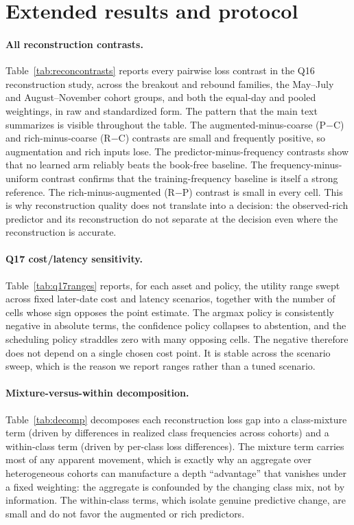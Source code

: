 \section{Extended results and protocol}
\label{app:extended}

\paragraph{All reconstruction contrasts.} Table~\ref{tab:reconcontrasts} reports every
pairwise loss contrast in the Q16 reconstruction study, across the breakout and rebound
families, the May--July and August--November cohort groups, and both the equal-day and pooled
weightings, in raw and standardized form. The pattern that the main text summarizes is
visible throughout the table. The augmented-minus-coarse (P$-$C) and rich-minus-coarse
(R$-$C) contrasts are small and frequently positive, so augmentation and rich inputs lose.
The predictor-minus-frequency contrasts show that no learned arm reliably beats the
book-free baseline. The frequency-minus-uniform contrast confirms that the
training-frequency baseline is itself a strong reference. The rich-minus-augmented (R$-$P)
contrast is small in every cell. This is why reconstruction quality does not translate into
a decision: the observed-rich predictor and its reconstruction do not separate at the
decision even where the reconstruction is accurate.



\paragraph{Q17 cost/latency sensitivity.} Table~\ref{tab:q17ranges} reports, for each asset
and policy, the utility range swept across fixed later-date cost and latency scenarios,
together with the number of cells whose sign opposes the point estimate. The argmax policy is
consistently negative in absolute terms, the confidence policy collapses to abstention, and
the scheduling policy straddles zero with many opposing cells. The negative therefore does not
depend on a single chosen cost point. It is stable across the scenario sweep, which is the
reason we report ranges rather than a tuned scenario.



\paragraph{Mixture-versus-within decomposition.} Table~\ref{tab:decomp} decomposes each
reconstruction loss gap into a class-mixture term (driven by differences in realized class
frequencies across cohorts) and a within-class term (driven by per-class loss differences).
The mixture term carries most of any apparent movement, which is exactly why an aggregate over
heterogeneous cohorts can manufacture a depth ``advantage'' that vanishes under a fixed
weighting: the aggregate is confounded by the changing class mix, not by information. The
within-class terms, which isolate genuine predictive change, are small and do not favor the
augmented or rich predictors.

